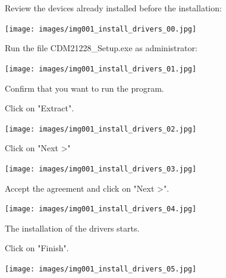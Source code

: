 \begin{minipage}{\linewidth}
  Review the devices already installed before the installation:
  \\
  \begin{center}
    \texttt{[image: images/img001\_install\_drivers\_00.jpg]}
  \end{center}
\end{minipage}

\begin{minipage}{\linewidth}
  Run the file CDM21228\_Setup.exe as administrator:
  \\
  \begin{center}
    \texttt{[image: images/img001\_install\_drivers\_01.jpg]}
  \end{center}
\end{minipage}

Confirm that you want to run the program.

\begin{minipage}{\linewidth}
  Click on "Extract".
  \\
  \begin{center}
    \texttt{[image: images/img001\_install\_drivers\_02.jpg]}
  \end{center}
\end{minipage}

\begin{minipage}{\linewidth}
  Click on "Next >"
  \\
  \begin{center}
    \texttt{[image: images/img001\_install\_drivers\_03.jpg]}
  \end{center}
\end{minipage}

\begin{minipage}{\linewidth}
  Accept the agreement and click on "Next >".
  \\
  \begin{center}
    \texttt{[image: images/img001\_install\_drivers\_04.jpg]}
  \end{center}
\end{minipage}

The installation of the drivers starts.

\begin{minipage}{\linewidth}
  Click on "Finish".
  \\
  \begin{center}
    \texttt{[image: images/img001\_install\_drivers\_05.jpg]}
  \end{center}
\end{minipage}


